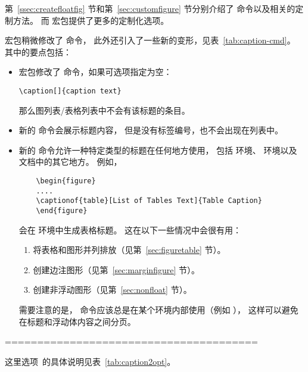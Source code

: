 第~\ref{ssec:createfloatfig} 节和第~\ref{sec:customfigure} 节分别介绍了  命令以及相关的定制方法。
而  宏包提供了更多的定制化选项。

 宏包稍微修改了  命令，
此外还引入了一些新的变形，见表~\ref{tab:caption-cmd}。
其中的要点包括：
\begin{itemize}
	\item {} 宏包修改了  命令，如果可选项指定为空：
\begin{lstlisting}
\caption[]{caption text}
\end{lstlisting}
	那么图列表/表格列表中不会有该标题的条目。
	
	\item 新的  命令会展示标题内容，
	但是没有标签编号，也不会出现在列表中。
	
	\item 新的  命令允许一种特定类型的标题在任何地方使用，
	包括  环境、 环境以及文档中的其它地方。
	例如，
	\begin{lstlisting}
	\begin{figure}
	....
	\captionof{table}[List of Tables Text]{Table Caption}
	\end{figure}
	\end{lstlisting}
	会在  环境中生成表格标题。
	这在以下一些情况中会很有用：
	\begin{enumerate}
		\item 将表格和图形并列排放（见第~\ref{sec:figuretable} 节）。
		\item 创建边注图形（见第~\ref{sec:marginfigure} 节）。
		\item 创建非浮动图形（见第~\ref{sec:nonfloat} 节）。
	\end{enumerate}
	需要注意的是， 命令应该总是在某个环境内部使用（例如 ），
	这样可以避免在标题和浮动体内容之间分页。
\end{itemize}

=======================================

这里{选项}~的具体说明见表~\ref{tab:caption2opt}。


